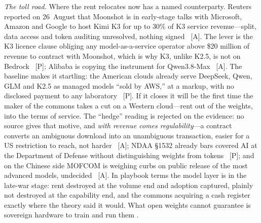 \emph{The toll road.} Where the rent relocates now has a named counterparty. Reuters reported on 26~August that Moonshot is in early-stage talks with Microsoft, Amazon and Google to host Kimi K3 for up to 30\% of K3 service revenue---split, data access and token auditing unresolved, nothing signed~\cite{moonshot-cloud-talks} [A]. The lever is the K3 licence clause obliging any model-as-a-service operator above \$20 million of revenue to contract with Moonshot, which is why K3, unlike K2.5, is not on Bedrock~\cite{kimi-k3-license-maas} [P]; Alibaba is copying the instrument for Qwen3.8-Max~\cite{qwen-revshare} [A]. The baseline makes it startling: the American clouds already serve DeepSeek, Qwen, GLM and K2.5 as managed models ``sold by AWS,'' at a markup, with no disclosed payment to any laboratory~\cite{us-clouds-chinese-weights} [P]. If it closes it will be the first time the maker of the commons takes a cut on a Western cloud---rent out of the weights, into the terms of service. The ``hedge'' reading is rejected on the evidence: no source gives that motive, and \emph{with revenue comes regulability}---a contract converts an ambiguous download into an unambiguous transaction, easier for a US restriction to reach, not harder~\cite{webster-regulability} [A]; NDAA \S1532 already bars covered AI at the Department of Defense without distinguishing weights from tokens~\cite{ndaa-1532} [P]; and on the Chinese side MOFCOM is weighing curbs on public release of the most advanced models, undecided~\cite{mofcom-model-curbs} [A]. In playbook terms the model layer is in the late-war stage: rent destroyed at the volume end and adoption captured, plainly not destroyed at the capability end, and the commons acquiring a cash register exactly where the theory said it would. What open weights cannot guarantee is sovereign hardware to train and run them .

